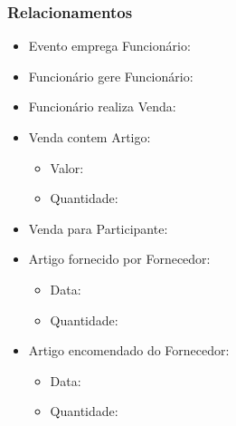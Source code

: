 \documentclass[a4paper,12pt]{scrreprt}
\begin{document}
             \subsubsection{Relacionamentos}
             \begin{itemize}
                 \item{Evento emprega Funcionário:}
                 \item{Funcionário gere Funcionário:}
                 \item{Funcionário realiza Venda:}
                 \item{Venda contem Artigo:}
                     \begin{itemize}
                     \item{Valor:}
                       
                     \item{Quantidade:}
                       
                     \end{itemize}
                 \item{Venda para Participante:}
                 \item{Artigo fornecido por Fornecedor:}
                     \begin{itemize}
                     \item{Data:}
                       
                     \item{Quantidade:}
                       
                     \end{itemize}
                 \item{Artigo encomendado do Fornecedor:}
                     \begin{itemize}
                     \item{Data:}
                       
                     \item{Quantidade:}
                       
                     \end{itemize}
             \end{itemize}
\end{document}
